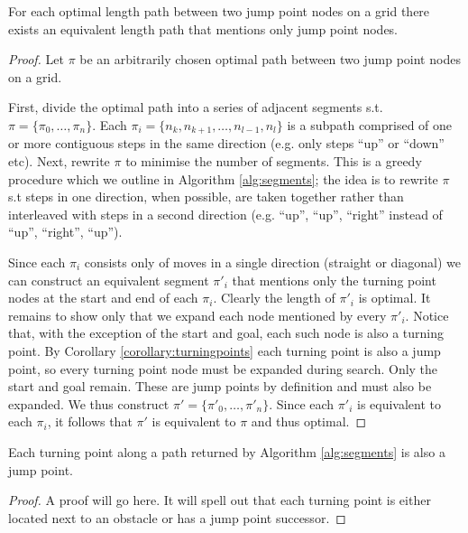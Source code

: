 \begin{lemma}
\label{lemma:jumping}
For each optimal length path between two jump point nodes on a grid there exists
an equivalent length path that mentions only jump point nodes.
\end{lemma}
\begin{proof}
Let $\pi$ be an arbitrarily chosen optimal path between two jump point nodes
on a grid.  
\par
First, divide the optimal path into a series of adjacent
segments s.t. $\pi = \lbrace \pi_{0}, \ldots, \pi_{n} \rbrace$. Each $\pi_{i} 
= \lbrace n_{k}, n_{k+1}, \ldots, n_{l-1}, n_{l} \rbrace$
is a subpath comprised of one or more contiguous steps in the same
direction (e.g.  only steps ``up'' or ``down'' etc).  Next, rewrite $\pi$ to
minimise the number of segments.  This is a greedy procedure which we
outline in Algorithm \ref{alg:segments}; the idea is to rewrite $\pi$ s.t steps
in one direction, when possible, are taken together rather than interleaved with
steps in a second direction (e.g. ``up'', ``up'', ``right'' instead of ``up'',
``right'', ``up'').  
\par
Since each $\pi_{i}$ consists only of moves in a single direction
(straight or diagonal) we can construct an equivalent segment $\pi'_{i}$ that
mentions only the turning point nodes at the start and end of each $\pi_{i}$.
Clearly the length of $\pi'_{i}$ is optimal.
It remains to show only that we expand each node mentioned by every $\pi'_{i}$.
Notice that, with the exception of the start and goal, each such node is also a 
turning point. 
By Corollary \ref{corollary:turningpoints} each turning point is 
also a jump point, so every turning point node must be expanded during search.
Only the start and goal remain. These are jump points by definition and must
also be expanded.
We thus construct $\pi' = \lbrace \pi'_{0}, \ldots, \pi'_{n}\rbrace$. Since each
$\pi'_{i}$ is equivalent to each $\pi_{i}$, it follows that $\pi'$ is equivalent
to $\pi$ and thus optimal.
\end{proof}

\begin{corollary}
\label{corollary:turningpoints}
Each turning point along a path returned by Algorithm \ref{alg:segments} is
also a jump point.
\end{corollary}
\begin{proof}
A proof will go here. It will spell out that each turning point is either
located next to an obstacle or has a jump point successor.
\end{proof}

